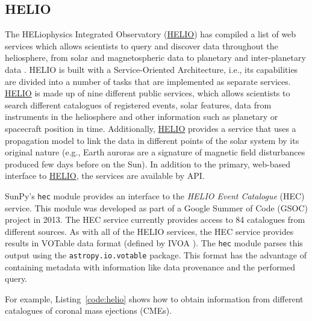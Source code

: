 \subsection{HELIO}\label{ssec:helio}

The HELiophysics Integrated Observatory (\href{http://helio-vo.eu}{HELIO}) has 
compiled a list of web services which allows scientists to query and 
discover data throughout the heliosphere, from solar and magnetospheric data to planetary and 
inter-planetary data \citep{dps2012}.
HELIO is built with a Service-Oriented Architecture, 
i.e., its capabilities are divided into a number of tasks that are 
implemented as separate services. 
\href{http://helio-vo.eu}{HELIO} is made up of nine different public services, 
which allows scientists to search different catalogues of registered events, 
solar features, data from instruments in the heliosphere and other information 
such as planetary or spacecraft position in time. 
Additionally, \href{http://helio-vo.eu}{HELIO} provides a service that uses a 
propagation model to link the data in different points of the solar system by 
its original nature (e.g., Earth auroras are a signature of magnetic 
field disturbances produced few days before on the Sun).
In addition to the primary, web-based interface to 
\href{http://helio-vo.eu}{HELIO}, the services are available by API.

SunPy's \texttt{hec} module provides an interface to the
\textit{HELIO Event Catalogue} (HEC) service. This module was developed as
part of a Google Summer of Code (GSOC) project in 2013.
The HEC service currently provides access to 84 catalogues from different
sources.
As with all of the HELIO services, the HEC service provides results in VOTable 
data format (defined by IVOA \citep{ochsenbein_ivoa_2011}). 
The \texttt{hec}
module parses this output using the \texttt{astropy.io.votable} package.
This format has the advantage of containing metadata with information like
data provenance and the performed query.

For example, Listing~\ref{code:helio} shows how to obtain information
from different catalogues of coronal mass ejections (CMEs).

